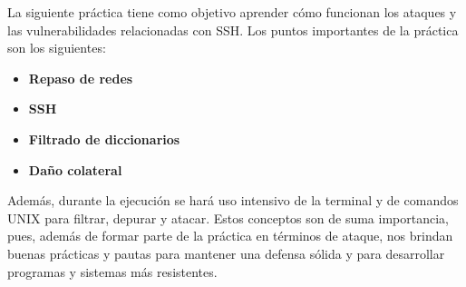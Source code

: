 La siguiente práctica tiene como objetivo aprender cómo funcionan los ataques y las vulnerabilidades relacionadas con SSH. Los puntos importantes de la práctica son los siguientes:

\begin{itemize}
  \item \textbf{Repaso de redes}
  \item \textbf{SSH}
  \item \textbf{Filtrado de diccionarios}
  \item \textbf{Daño colateral}
\end{itemize}

Además, durante la ejecución se hará uso intensivo de la terminal y de comandos UNIX para filtrar, depurar y atacar. Estos conceptos son de suma importancia, pues, además de formar parte de la práctica en términos de ataque, nos brindan buenas prácticas y pautas para mantener una defensa sólida y para desarrollar programas y sistemas más resistentes.
